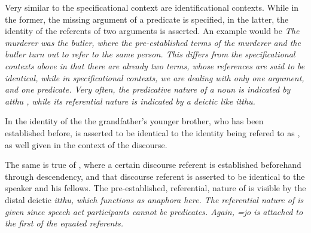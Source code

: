 % 
% 
% 
% 

Very similar to the specificational context are identificational contexts. While in the former, the missing argument of a predicate is specified, in the latter, the identity of the referents  of two arguments is asserted. An example would be \em The murderer was the butler\em, where the pre-established terms of \em the murderer \em and \em the butler \em turn out to refer to the same person. This differs from the specificational contexts above in that there are already \em two \em terms, whose references are said to be identical, while in specificational contexts, we are dealing with only one argument, and one predicate. Very often, the predicative nature of a noun is indicated by \em atthu \em {}, while its referential nature is indicated by a deictic like \em itthu\em.

In  the identity of the the grandfather's younger brother, who has been established before, is asserted to be identical to the identity being refered to as , as well given in the context of the discourse.



The same is true of , where a certain discourse referent is established beforehand through descendency, and that discourse referent is asserted to be identical to the speaker and his fellows. The pre-established, referential, nature of  is visible by the distal deictic \em itthu\em, which functions as anaphora here. The referential nature of  is given since speech act participants cannot be predicates. Again, \em =jo \em is attached to the first of the equated referents.

